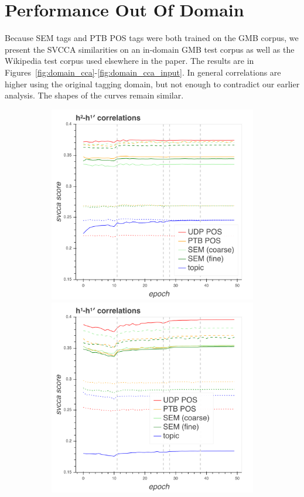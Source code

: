\section{Performance Out Of Domain}
\label{sec:domain}

Because SEM tags and PTB POS tags were both trained on the GMB corpus, we present the SVCCA similarities on an in-domain GMB test corpus as well as the Wikipedia test corpus used elsewhere in the paper. The results are in Figures~\ref{fig:domain_cca}-\ref{fig:domain_cca_input}. In general correlations are higher using the original tagging domain, but not enough to contradict our earlier analysis. The shapes of the curves remain similar.

\begin{figure}
\centering
\begin{subfigure}{.48\textwidth}
\includegraphics[width=\textwidth]{svcca/cca_output_domain_2.png}
\includegraphics[width=\textwidth]{svcca/cca_output_domain_1.png}

\end{subfigure}
\end{figure}
